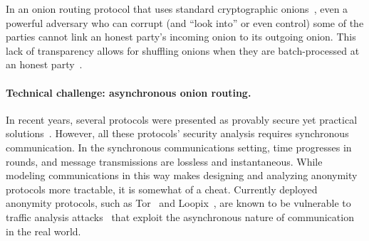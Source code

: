 \documentclass[runningheads,a4paper]{llncs}
\begin{document}
In an onion routing protocol that uses standard cryptographic onions~\cite{C:CamLys05}, %
even a powerful adversary who can corrupt (and ``look into'' or even control) some of the parties cannot link an honest party's incoming onion to its outgoing onion. This lack of transparency allows for shuffling onions when they are batch-processed at an honest party~\cite{STOC:RacSim93,FC:BerFiaTas04,iwanik2005duo, ICALP:AndLysUpf18}.%


\paragraph{Technical challenge: asynchronous onion routing.}
In recent years, several protocols were presented as provably secure yet practical solutions~\cite{SP:CorBonMaz15, vuvuzela, stadium, atom, ICALP:AndLysUpf18, ando2019complexity}. However, all these protocols' security analysis requires synchronous communication. 
In the synchronous communications setting, time progresses in rounds, and message transmissions are lossless and instantaneous. While modeling communications in this way makes designing and analyzing anonymity protocols more tractable, it is somewhat of a cheat. Currently deployed anonymity protocols, such as Tor~\cite{tor} and Loopix~\cite{piotrowska2017loopix}, are known to be vulnerable to traffic analysis attacks~\cite{SP:MurDan05, SEVL+15, WSJCM18, attarian2023mixflow}
that exploit the asynchronous nature of communication in the real world.
\end{document}

